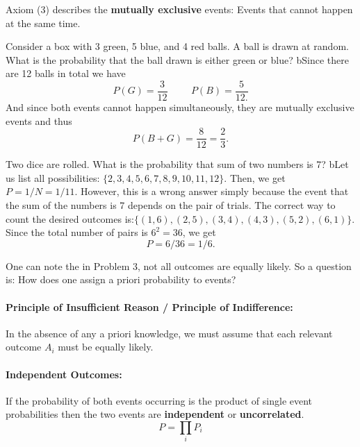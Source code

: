         Axiom (3) describes the \textbf{mutually exclusive} events: Events that cannot happen at the same time.
        \begin{problem}{Consider a box with 3 green, 5 blue, and 4 red balls. A ball is drawn at random. What is the probability that the ball drawn is either green or blue?}
        bSince there are 12 balls in total we have \[P(G) = \frac{3}{12} \hspace{1cm} P(B) = \frac{5}{12.}\] And since both events cannot happen simultaneously, they are mutually exclusive events and thus \[ P(B+G) = \frac{8}{12} = \frac{2}{3}.\]
        \end{problem}
        \begin{problem}{Two dice are rolled. What is the probability that sum of two numbers is 7?}
           bLet us list all possibilities: $\{2,3,4,5,6,7,8,9,10,11,12\}$. Then, we get $P = 1/N = 1/11$. However, this is a wrong answer simply because the event that the sum of the numbers is 7 depends on the pair of trials. The correct way to count the desired outcomes is:$ \{(1,6),(2,5),(3,4),(4,3),(5,2),(6,1)\}$. Since the total number of pairs is $6^2=36$, we get \[P =6/36 = 1/6.\]
        \end{problem}
        One can note the in Problem 3, not all outcomes are equally likely. So a question is: How does one assign a priori probability to events?
        \paragraph{Principle of Insufficient Reason / Principle of Indifference: }In the absence of any a priori knowledge, we must assume that each relevant outcome $A_i$ must be equally likely.
        \paragraph{Independent Outcomes:} If the probability of both events occurring is the product of single event probabilities then the two events are \textbf{independent} or \textbf{uncorrelated}. 
        \begin{equation}
            P = \prod_i P_i
        \end{equation}
